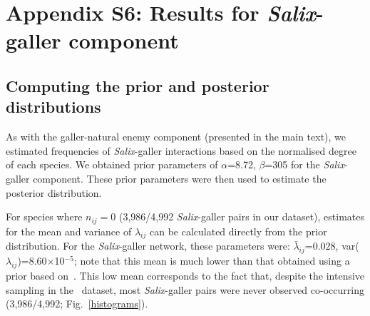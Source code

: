 \documentclass[12pt]{article}
\begin{document}
\clearpage

\section*{Appendix S6: Results for \emph{Salix}-galler component}

    \subsection*{Computing the prior and posterior distributions}

      As with the galler-natural enemy component (presented in the main text), we estimated frequencies of \emph{Salix}-galler interactions based on the normalised degree of each species. We obtained prior parameters of $\alpha$=8.72, $\beta$=305 for the \emph{Salix}-galler component. These prior parameters were then used to estimate the posterior distribution. 


      For species where $n_{ij}=0$ (3,986/4,992 \emph{Salix}-galler pairs in our dataset), estimates for the mean and variance of $\lambda_{ij}$ can be calculated directly from the prior distribution. For the \emph{Salix}-galler network, these parameters were: $\bar\lambda_{ij}$=0.028, var($\lambda_{ij}$)=8.60$\times$10$^{-5}$; note that this mean is much lower than that obtained using a prior based on~\citet[Data available from the Dryad Digital Repository: https://doi.org/10.5061/dryad.g7805]{Barbour2016}. This low mean corresponds to the fact that, despite the intensive sampling in the~\citet{Kopelke2017} dataset, most \emph{Salix}-galler pairs were never observed co-occurring (3,986/4,992; Fig.~\ref{histograms}).
\end{document}
